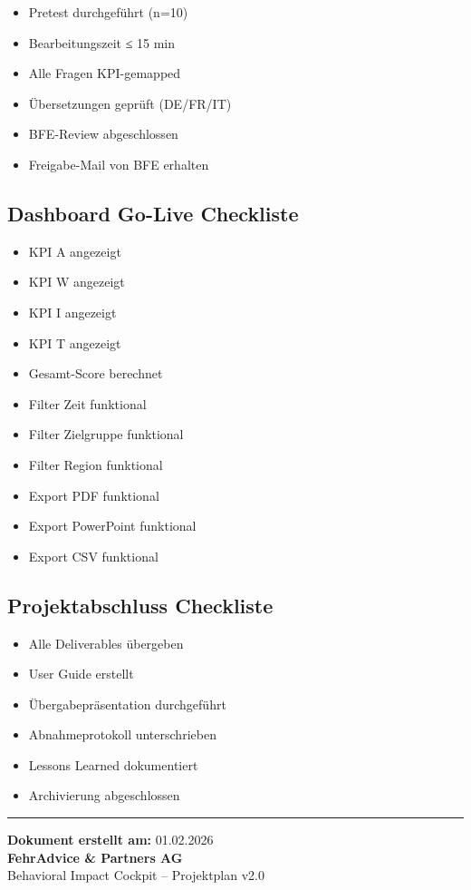 \documentclass[11pt,a4paper]{article}
\begin{document}
\begin{itemize}[leftmargin=*]
    \item[$\square$] Pretest durchgeführt (n=10)
    \item[$\square$] Bearbeitungszeit ≤ 15 min
    \item[$\square$] Alle Fragen KPI-gemapped
    \item[$\square$] Übersetzungen geprüft (DE/FR/IT)
    \item[$\square$] BFE-Review abgeschlossen
    \item[$\square$] Freigabe-Mail von BFE erhalten
\end{itemize}

\subsection{Dashboard Go-Live Checkliste}

\begin{itemize}[leftmargin=*]
    \item[$\square$] KPI A angezeigt
    \item[$\square$] KPI W angezeigt
    \item[$\square$] KPI I angezeigt
    \item[$\square$] KPI T angezeigt
    \item[$\square$] Gesamt-Score berechnet
    \item[$\square$] Filter Zeit funktional
    \item[$\square$] Filter Zielgruppe funktional
    \item[$\square$] Filter Region funktional
    \item[$\square$] Export PDF funktional
    \item[$\square$] Export PowerPoint funktional
    \item[$\square$] Export CSV funktional
\end{itemize}

\subsection{Projektabschluss Checkliste}

\begin{itemize}[leftmargin=*]
    \item[$\square$] Alle Deliverables übergeben
    \item[$\square$] User Guide erstellt
    \item[$\square$] Übergabepräsentation durchgeführt
    \item[$\square$] Abnahmeprotokoll unterschrieben
    \item[$\square$] Lessons Learned dokumentiert
    \item[$\square$] Archivierung abgeschlossen
\end{itemize}

\vfill

\begin{center}
{\color{fadarkgray}\rule{0.5\textwidth}{0.5pt}}

\vspace{0.5cm}

{\small\color{fadarkgray}
\textbf{Dokument erstellt am:} 01.02.2026\\
\textbf{FehrAdvice \& Partners AG}\\
Behavioral Impact Cockpit -- Projektplan v2.0
}
\end{center}
\end{document}

